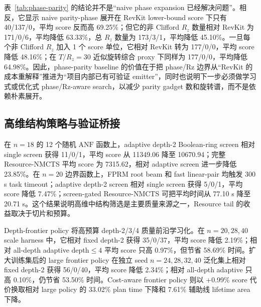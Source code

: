 \documentclass[UTF8,fontset=macnew,11pt]{ctexart}
\newcommand{\method}{Resource-NMCTS}
\newcommand{\anf}{\ensuremath{\mathrm{ANF}}}
\newcommand{\rz}{\ensuremath{R_z}}
\begin{document}
\begin{table}[H]
\centering
\small
\caption{Phase-parity \anf{} emitter 与 RevKit \texttt{oracle\_synth} 的 phase/Rz 同口径比较。该 emitter 实现 phase oracle up to global phase；lower-bound score 只计 T-like rotations，非 Clifford \rz{} 单独报告。}
\label{tab:phase-parity}

\end{table}

表~\ref{tab:phase-parity} 的结论并不是“naive phase expansion 已经解决问题”。相反，它显示 naive parity-phase 展开在 RevKit lower-bound score 下只有 40/137/0，平均 score 反而高 69.25\%；但它的非 Clifford \rz{} 数量相对 RevKit 为 171/0/6，平均降低 63.33\%，总 \rz{} 数量为 173/3/1，平均降低 45.10\%。一旦每个非 Clifford \rz{} 加入 1 个 score 单位，它相对 RevKit 转为 177/0/0，平均 score 降低 48.16\%；在 $T/R_z=30$ 近似旋转综合 proxy 下同样为 177/0/0，平均降低 64.98\%。因此，phase-parity baseline 的价值在于把 phase/Rz 边界从“RevKit 的成本重解释”推进为“项目内部已有可验证 emitter”，同时也说明下一步必须做学习式或优化式 phase/Rz-aware search，以减少 parity gadget 数和旋转谱，而不是依赖朴素展开。

\subsection{高维结构策略与验证桥接}

在 $n=18$ 的 12 个随机 \anf{} 函数上，adaptive depth-2 Boolean-ring screen 相对 single screen 获得 11/0/1，平均 score 从 11349.06 降至 10670.94；完整 \method{} 平均 score 为 7315.62，相对 adaptive screen 进一步降低 23.85\%。在 $n=20$ 边界函数上，FPRM root beam 和 fast linear-pair 均触发 300 s task timeout；adaptive depth-2 screen 相对 single screen 获得 5/0/1，平均 score 降低 7.47\%；screen-gated \method{} 可把平均时间从 77.10 s 降至 20.71 s。这个结果说明高维中结构筛选是主要质量来源之一，Resource tail 的收益取决于切片和预算。

Depth-frontier policy 将高预算 depth-2/3/4 质量前沿学习化。在 $n=20,28,40$ scale harness 中，它相对 fixed depth-2 获得 35/0/37，平均 score 降低 2.19\%；相对 all-depth adaptive depth$\leq4$ 平均 score 只高 0.97\%，但节省 58.69\% 时间。扩大训练集后的 large frontier policy 在独立 seed $n=24,28,32,40$ 泛化集上相对 fixed depth-2 获得 56/0/40，平均 score 降低 2.34\%；相对 all-depth adaptive 只高 0.10\%，仍节省 53.50\% 时间。Cost-aware frontier policy 则以 +0.99\% score 代价换取相对 large policy 的 33.02\% plan time 下降和 7.61\% 辅助线 lifetime area 下降。
\end{document}
